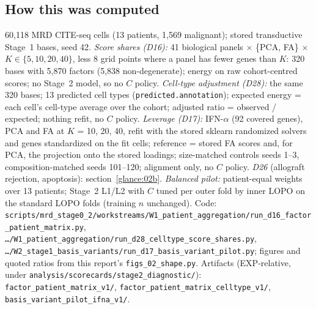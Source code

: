 \subsection*{How this was computed}
{\small\raggedright
60,118 MRD CITE-seq cells (13 patients, 1,569 malignant); stored transductive Stage~1 bases, seed 42. \emph{Score shares (D16):} 41 biological panels $\times$ \{PCA, FA\} $\times$ $K \in \{5,10,20,40\}$, less 8 grid points where a panel has fewer genes than $K$: 320 bases with 5,870 factors (5,838 non-degenerate); energy on raw cohort-centred scores; no Stage~2 model, so no $C$ policy. \emph{Cell-type adjustment (D28):} the same 320 bases; 13 predicted cell types (\texttt{predicted.annotation}); expected energy = each cell's cell-type average over the cohort; adjusted ratio = observed / expected; nothing refit, no $C$ policy. \emph{Leverage (D17):} IFN-$\alpha$ (92 covered genes), PCA and FA at $K$ = 10, 20, 40, refit with the stored sklearn randomized solvers and genes standardized on the fit cells; reference = stored FA scores and, for PCA, the projection onto the stored loadings; size-matched controls seeds 1--3, composition-matched seeds 101--120; alignment only, no $C$ policy. \emph{D26} (allograft rejection, apoptosis): section~\ref{glance:02b}. \emph{Balanced pilot:} patient-equal weights over 13 patients; Stage~2 L1/L2 with $C$ tuned per outer fold by inner LOPO on the standard LOPO folds (training $n$ unchanged). Code: \texttt{scripts/\allowbreak mrd\_stage0\_2/\allowbreak workstreams/\allowbreak W1\_patient\_aggregation/\allowbreak run\_d16\_factor\_patient\_matrix.py}, \texttt{\ldots/\allowbreak W1\_patient\_aggregation/\allowbreak run\_d28\_celltype\_score\_shares.py}, \texttt{\ldots/\allowbreak W2\_stage1\_basis\_variants/\allowbreak run\_d17\_basis\_variant\_pilot.py}; figures and quoted ratios from this report's \texttt{figs\_02\_shape.py}. Artifacts (EXP-relative, under \texttt{analysis/\allowbreak scorecards/\allowbreak stage2\_diagnostic/}): \texttt{factor\_patient\_matrix\_v1/}, \texttt{factor\_patient\_matrix\_celltype\_v1/}, \texttt{basis\_variant\_pilot\_ifna\_v1/}. \par}
